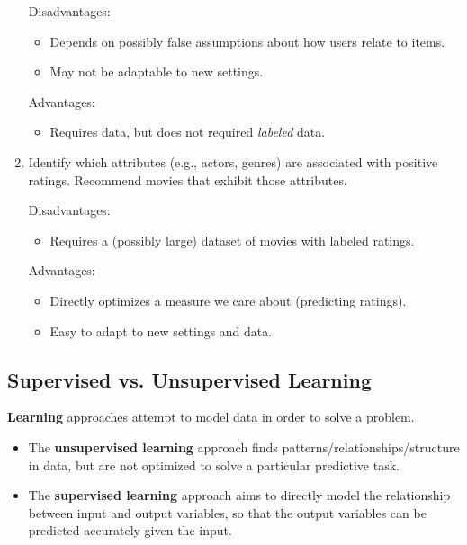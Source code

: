 \documentclass[letterpaper]{article}
\begin{document}
\begin{mdframed}[]
\begin{enumerate}
        \begin{mdframed}[]
            Disadvantages:
            \begin{itemize}
                \item Depends on possibly false assumptions about how users relate to items. 
                \item May not be adaptable to new settings. 
            \end{itemize}
            Advantages:
            \begin{itemize}
                \item Requires data, but does not required \emph{labeled} data. 
            \end{itemize}
        \end{mdframed}
        \item Identify which attributes (e.g., actors, genres) are associated with positive ratings. Recommend movies that exhibit those attributes.
        
        \begin{mdframed}[]
            Disadvantages:
            \begin{itemize}
                \item Requires a (possibly large) dataset of movies with labeled ratings. 
            \end{itemize}
            Advantages:
            \begin{itemize}
                \item Directly optimizes a measure we care about (predicting ratings).
                \item Easy to adapt to new settings and data. 
            \end{itemize}
        \end{mdframed}
    \end{enumerate}
\end{mdframed}

\subsection{Supervised vs. Unsupervised Learning}
\textbf{Learning} approaches attempt to model data in order to solve a problem. 
\begin{itemize}
    \item The \textbf{unsupervised learning} approach finds patterns/relationships/structure in data, but are not optimized to solve a particular predictive task.  
    \item The \textbf{supervised learning} approach aims to directly model the relationship between input and output variables, so that the output variables can be predicted accurately given the input.
\end{itemize}
\end{document}
